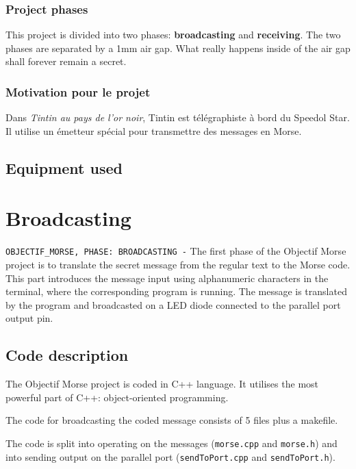 \documentclass[12pt]{report}
\begin{document}
\newpage

\subsection{Project phases}

This project is divided into two phases: \textbf{broadcasting} and \textbf{receiving}. The two phases are separated by a 1mm air gap. What really happens inside of the air gap shall forever remain a secret.

\subsection{Motivation pour le projet}

Dans \textit{Tintin au pays de l'or noir}, Tintin est télégraphiste à bord du Speedol Star. Il utilise un émetteur spécial pour transmettre des messages en Morse.

\section{Equipment used}





\newpage

\chapter{Broadcasting}

\verb|OBJECTIF_MORSE, PHASE: BROADCASTING -| The first phase of the Objectif Morse project is to translate the secret message from the regular text to the Morse code. This part introduces the message input using alphanumeric characters in the terminal, where the corresponding program is running. The message is translated by the program and broadcasted on a LED diode connected to the parallel port output pin.

\section{Code description}

The Objectif Morse project is coded in C++ language. It utilises the most powerful part of C++: object-oriented programming.

The code for broadcasting the coded message consists of 5 files plus a makefile. 

The code is split into operating on the messages (\verb|morse.cpp| and \verb|morse.h|) and into sending output on the parallel port (\verb|sendToPort.cpp| and \verb|sendToPort.h|).
\end{document}
